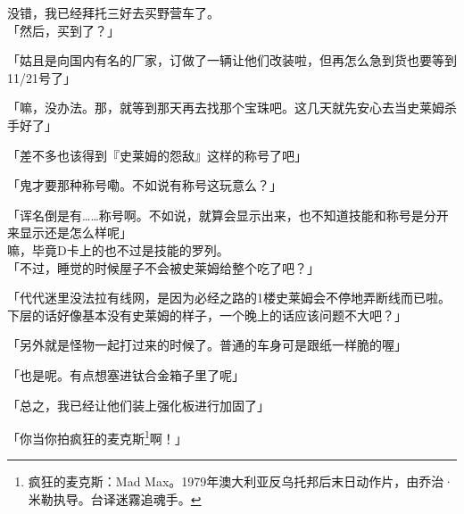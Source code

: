 没错，我已经拜托三好去买野营车了。\\

「然后，买到了？」

「姑且是向国内有名的厂家，订做了一辆让他们改装啦，但再怎么急到货也要等到11/21号了」

「嘛，没办法。那，就等到那天再去找那个宝珠吧。这几天就先安心去当史莱姆杀手好了」

「差不多也该得到『史莱姆的怨敌』这样的称号了吧」

「鬼才要那种称号嘞。不如说有称号这玩意么？」

「诨名倒是有……称号啊。不如说，就算会显示出来，也不知道技能和称号是分开来显示还是怎么样呢」\\

嘛，毕竟D卡上的也不过是技能的罗列。\\

「不过，睡觉的时候屋子不会被史莱姆给整个吃了吧？」

「代代迷里没法拉有线网，是因为必经之路的1楼史莱姆会不停地弄断线而已啦。下层的话好像基本没有史莱姆的样子，一个晚上的话应该问题不大吧？」

「另外就是怪物一起打过来的时候了。普通的车身可是跟纸一样脆的喔」

「也是呢。有点想塞进钛合金箱子里了呢」

「总之，我已经让他们装上强化板进行加固了」

「你当你拍疯狂的麦克斯\footnote{疯狂的麦克斯：Mad Max。1979年澳大利亚反乌托邦后末日动作片，由乔治·米勒执导。台译迷霧追魂手。}啊！」


